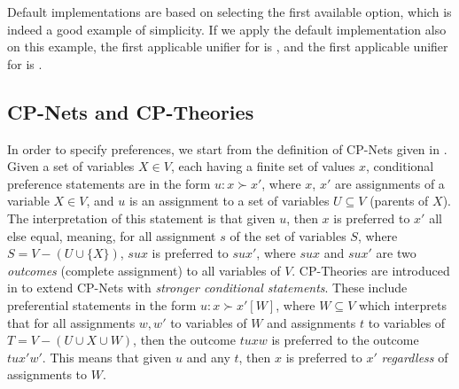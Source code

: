 Default implementations are based on selecting the first available option, which is indeed a good example of simplicity.
If we apply the default implementation also on this example, the first applicable unifier for  is , and the first applicable unifier for  is .  %


\subsection{CP-Nets and CP-Theories}
\label{ssec:prefs}


In order to specify preferences, we start from the definition of CP-Nets given in \cite{Boutilier2004}. Given a set of variables $X \in V$, each having a finite set of values $x$, conditional preference statements are in the form $u : x \succ x'$, where $x$, $x'$ are assignments of a variable $X \in V$, and $u$ is an assignment to a set of variables $U \subseteq V$ (parents of $X$). The interpretation of this statement is that given $u$, then $x$ is preferred to $x'$ all else equal, meaning, for all assignment $s$ of the set of variables $S$, where $S = V - (U \cup \{X\})$, $sux$ is preferred to $sux'$, where $sux$ and $sux'$ are two \textit{outcomes} (complete assignment) to all variables of $V$. 
CP-Theories are introduced in \cite{Wilson2004} to extend CP-Nets with \textit{stronger conditional statements}. These include preferential statements in the form $u : x \succ x' [W]$, where $W \subseteq V$ which interprets that for all assignments $w,w'$ to variables of $W$ and assignments $t$ to variables of $T = V - (U \cup {X} \cup W)$, then the outcome $tuxw$ is preferred to the outcome $tux'w'$. This means that given $u$ and any $t$, then $x$ is preferred to $x'$ \textit{regardless} of assignments to $W$.



